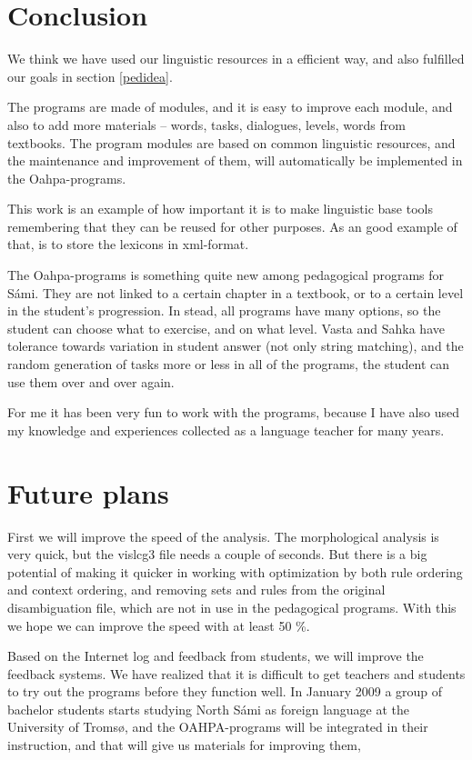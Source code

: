 \documentclass[a4paper,12pt]{article}
\begin{document}
\section{Conclusion}
We think we have used our linguistic resources in a efficient way, and also fulfilled our goals in section \ref{pedidea}.  

The programs are made of modules, and it is easy to improve each module, and also to add more materials -- words, tasks, dialogues, levels, words from textbooks. The program modules are based on common linguistic resources, and the maintenance  and improvement of them, will automatically be implemented in the Oahpa-programs.  

This work is an example of how important it is to make linguistic base tools remembering that they can be reused for other purposes. As an good example of that, is to store the lexicons in xml-format. 

The Oahpa-programs is something quite new among pedagogical programs for Sámi. They are not linked to a certain chapter in a textbook, or to a certain level in the student's progression. In stead, all programs have many options, so the student can choose what to exercise, and on what level. Vasta and Sahka have tolerance towards variation in student answer (not only string matching), and the random generation of tasks more or less in all of the programs, the student can use them over and over again. 

For me it has been very fun to work with the programs, because I have also used my knowledge and experiences collected as a language teacher for many years. 


\section{Future plans}
First we will improve the speed of the analysis. The morphological analysis is very quick, but the vislcg3 file needs a couple of seconds. But there is a big potential of making it quicker in working with optimization by both rule ordering and context ordering, and removing sets and rules from the original disambiguation file, which are not in use in the pedagogical programs. With this we hope we can improve the speed with at least 50 \%. 

Based on the Internet log and feedback from students, we will improve the feedback systems. We have realized that it is difficult to get teachers and students to try out the programs before they function well. In January 2009 a group of bachelor students starts studying North Sámi as foreign language at the University of Tromsø, and the OAHPA-programs will be integrated in their instruction, and that will give us materials for improving them, 
\end{document}

